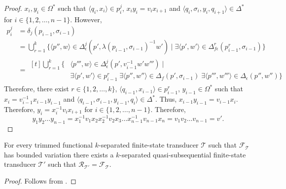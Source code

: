 \begin{proof}
  $x_i, y_i \in \Omega^*$ such that $\langle q_i, x_i \rangle \in p_i^j$,
  $x_i y_i = v_i x_{i+1}$ and $\langle q_i, \sigma_i, y_i, q_{i+1} \rangle
  \in \Delta^*$ for $i \in \{ 1, 2, \ldots, n-1 \}$.
  However,
  \begin{align*}
    p_i^j &= \delta_j(p_{i-1}, \sigma_{i-1})\\
    &= \bigcup_{r=1}^k \{ \langle p'', w \rangle \in \Delta_\epsilon^j(p',
    \lambda(p_{i-1}, \sigma_{i-1})^{-1}w') \mid \exists \langle p', w' \rangle \in
    \Delta_{f\epsilon}^r(p_{i-1}^r, \sigma_{i-1}) \}\\
    &= \begin{aligned}[t]
      \bigcup_{r=1}^k \{ &\langle p''', w \rangle \in \Delta_\epsilon^j(p',
      v_{i-1}^{-1}w'w''') \mid\\
      &\exists \langle p', w' \rangle \in p_{i-1}^r \; \exists \langle p'', w''
      \rangle \in \Delta_f(p', \sigma_{i-1}) \; \exists \langle p''', w''' \rangle
      \in \Delta_\epsilon(p'', w'') \}
    \end{aligned}
  \end{align*}
  Therefore, there exist $r \in \{ 1, 2, \ldots, k \}$, $\langle q_{i-1}, x_{i-1}
  \rangle \in  p_{i-1}^r$, $y_{i-1} \in \Omega^*$ such that $x_i = v_{i-1}^{-1}
  x_{i-1} y_{i-1}$ and $\langle q_{i-1}, \sigma_{i-1}, y_{i-1}, q_i \rangle \in
  \Delta^*$. Thus, $x_{i-1} y_{i-1} = v_{i-1} x_i$.
  Therefore, $y_i = x_i^{-1} v_i x_{i+1}$ for $i \in \{ 1, 2, \ldots, n-1 \}$.
  Therefore,
  \begin{equation*}
    y_1 y_2 \ldots y_{n-1} = x_1^{-1} v_1 x_2 x_2^{-1} v_2 x_3 \ldots x_{n-1}^{-1}
    v_{n-1} x_n = v_1 v_2 \ldots v_{n-1} = v'.
  \end{equation*}
\end{proof}

\begin{theorem}
  For every trimmed functional $k$-separated finite-state transducer $\mathcal{T}$
  such that $\mathcal{F}_\mathcal{T}$ has bounded variation there exists a 
  $k$-separated quasi-subsequential finite-state transducer $\mathcal{T'}$ such that
  $\mathcal{R}_{\mathcal{T}'} = \mathcal{F}_\mathcal{T}$.
\end{theorem}

\begin{proof}
  Follows from .
\end{proof}
